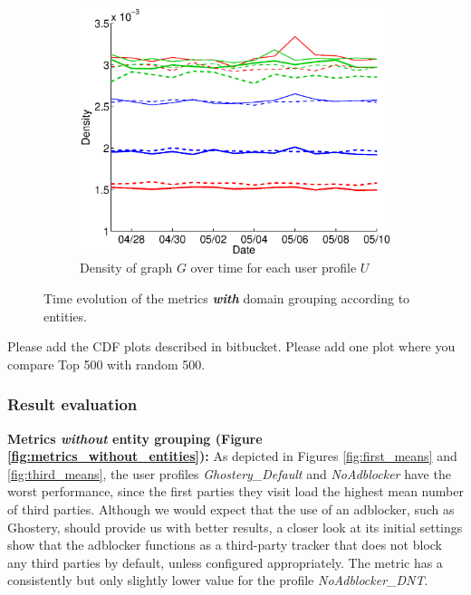 \documentclass{sig-alternate}
\begin{document}
\begin{figure}
  \begin{subfigure}{.45\textwidth}
    \includegraphics[width=\textwidth]{figures/plots/density-entities.eps}
    \caption{Density of graph $G$ over time for each user profile $U$}
    \label{fig:density_entities}
  \end{subfigure}
  \caption{Time evolution of the metrics \textbf{\textit{with}} domain grouping according to entities.}
  \label{fig:metrics_with_entities}
  \end{figure}

{\color{red}Please add the CDF plots described in bitbucket.}
{\color{red}Please add one plot where you compare Top 500 with random 500.}

\subsubsection{Result evaluation}

\textbf{Metrics \textit{without} entity grouping (Figure \ref{fig:metrics_without_entities}):} As depicted in Figures \ref{fig:first_means} and \ref{fig:third_means}, the user profiles \textit{Ghostery\_Default} and \textit{NoAdblocker} have the worst performance, since the first parties they visit load the highest mean number of third parties. Although we would expect that the use of an adblocker, such as Ghostery, should provide us with better results, a closer look at its initial settings show that the adblocker functions as a third-party tracker that does not block any third parties by default, unless configured appropriately. The metric has a consistently but only slightly lower value for the profile \textit{NoAdblocker\_DNT}.
\end{document}
